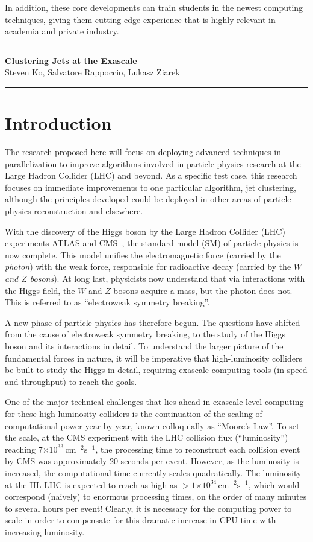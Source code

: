 \documentclass[times,11pt]{article}
\newcommand{\instlumiA}     {\ensuremath{\times 10^{33} \,\mathrm{cm}^{-2} \mathrm{s}^{-1}}}
\newcommand{\instlumiB}     {\ensuremath{\times 10^{34} \,\mathrm{cm}^{-2} \mathrm{s}^{-1}}}
\begin{document}
In addition, these core developments can train students in the newest
computing techniques, giving them cutting-edge experience that is
highly relevant in academia and private industry. 

\newpage

\hrule
\begin{center}
{\bf \Large Clustering Jets at the Exascale}\\
Steven Ko, Salvatore Rappoccio, Lukasz Ziarek
\end{center}
\hrule
\bigskip

\section{Introduction}

The research proposed here will focus on deploying advanced techniques
in parallelization to improve algorithms involved in particle physics
research at the Large Hadron Collider (LHC) and beyond. As a
specific test case, this research focuses on immediate improvements to
one particular algorithm, jet
clustering, although the principles
developed could be deployed in other areas of particle physics
reconstruction and elsewhere. 

With the discovery of the Higgs boson 
by the Large Hadron Collider (LHC)
experiments ATLAS and CMS~\cite{higgs_cms,higgs_atlas}, the
standard model (SM) of particle
physics is now complete. This model unifies the electromagnetic force
(carried by the {\em photon}) with the weak force, responsible for
radioactive decay (carried by the {\em $W$ and $Z$ bosons}).
At long last,
physicists now understand that via interactions with the Higgs field,
the $W$ and $Z$ bosons acquire a mass, but the photon does not. 
This is referred to as ``electroweak symmetry breaking''. 


A new phase of particle physics has therefore begun. 
The questions have shifted from the cause of electroweak symmetry
breaking, to the study of the Higgs boson and its interactions in
detail. To understand the larger picture of the fundamental forces in
nature, it will be imperative that high-luminosity colliders be built
to study the Higgs in detail, requiring exascale computing tools (in
speed and throughput) to reach the goals. 


One of the major technical challenges that lies ahead in
exascale-level computing for these high-luminosity colliders is the
continuation of the scaling of computational power year by year, known
colloquially as ``Moore's Law''. 
To set the scale, at the CMS experiment
with the LHC collision flux (``luminosity'') reaching
$7\instlumiA$, the processing
time to reconstruct each collision event by CMS was approximately 20
seconds per event. However, as the luminosity is
increased, the computational time currently scales
quadratically. The luminosity at the HL-LHC is expected to reach as
high as $>1\instlumiB$, which would correspond (naively) to enormous
processing times, on the order of many minutes to several
hours per event! Clearly, it is necessary for the
computing power to scale in order to compensate for this dramatic
increase in CPU time with increasing luminosity. 
\end{document}
